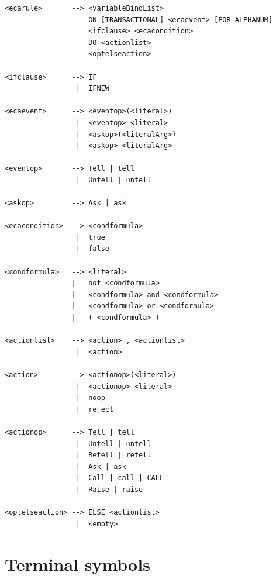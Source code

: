 {\small
\begin{verbatim}
<ecarule>       --> <variableBindList>
                    ON [TRANSACTIONAL] <ecaevent> [FOR ALPHANUM]
                    <ifclause> <ecacondition>
                    DO <actionlist>
                    <optelseaction>

<ifclause>      --> IF
                 |  IFNEW

<ecaevent>      --> <eventop>(<literal>)
                 |  <eventop> <literal>
                 |  <askop>(<literalArg>)
                 |  <askop> <literalArg> 

<eventop>       --> Tell | tell
                 |  Untell | untell

<askop>         --> Ask | ask

<ecacondition>  --> <condformula>
                 |  true
                 |  false

<condformula>   --> <literal>
                |   not <condformula>
                |   <condformula> and <condformula>
                |   <condformula> or <condformula>
                |   ( <condformula> )

<actionlist>    --> <action> , <actionlist>
                 |  <action>

<action>        --> <actionop>(<literal>)
                 |  <actionop> <literal>
                 |  noop
                 |  reject

<actionop>      --> Tell | tell
                 |  Untell | untell
                 |  Retell | retell
                 |  Ask | ask
                 |  Call | call | CALL
                 |  Raise | raise

<optelseaction> --> ELSE <actionlist>
                 |  <empty>
\end{verbatim}
}

\section{Terminal symbols}
\label{sec:terminal symbols}

